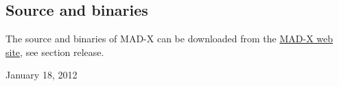


\subsection{Source and binaries}

 The source and binaries of MAD-X can be downloaded from the \href{http://cern.ch/madx}{MAD-X web site}, see section release.  
% 
% 
% 
% 
% 
% 

 January 18, 2012 

